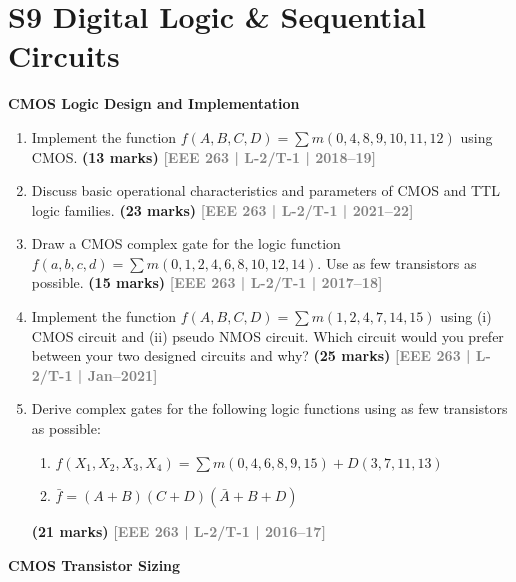 \documentclass[12pt,a4paper]{article}
\newcommand{\yr}[1]{\hfill\textcolor{gray}{\small\textbf{[#1]}}}
\newcommand{\mk}[1]{\textcolor{orange!70!black}{\small\textbf{(#1 marks)}}}
\newcommand{\subtopic}[2]{%
  \vspace{10pt}
  \noindent\begin{tcolorbox}[colback=#1!8,colframe=#1,boxrule=0.6pt,arc=4pt,
    left=6pt,right=6pt,top=4pt,bottom=4pt]
    \small\bfseries\textcolor{#1}{#2}
  \end{tcolorbox}
  \vspace{2pt}
}
\begin{document}
\section*{S9 \quad Digital Logic \& Sequential Circuits}

\subtopic{cD}{CMOS Logic Design and Implementation}
\label{sub:s9-cmos}

\begin{enumerate}

\item Implement the function $f(A,B,C,D)=\sum m(0,4,8,9,10,11,12)$ using CMOS.
\mk{13} \yr{EEE 263 | L-2/T-1 | 2018--19}

\item Discuss basic operational characteristics and parameters of CMOS and TTL logic families.
\mk{23} \yr{EEE 263 | L-2/T-1 | 2021--22}

\item Draw a CMOS complex gate for the logic function $f(a,b,c,d)=\sum m(0,1,2,4,6,8,10,12,14)$. Use as few transistors as possible.
\mk{15} \yr{EEE 263 | L-2/T-1 | 2017--18}

\item Implement the function $f(A,B,C,D)=\sum m(1,2,4,7,14,15)$ using (i) CMOS circuit and (ii) pseudo NMOS circuit. Which circuit would you prefer between your two designed circuits and why?
\mk{25} \yr{EEE 263 | L-2/T-1 | Jan--2021}

\item Derive complex gates for the following logic functions using as few transistors as possible:
\begin{enumerate}
  \item $f(X_1,X_2,X_3,X_4)=\sum m(0,4,6,8,9,15)+D(3,7,11,13)$
  \item $\bar{f}=(A+B)(C+D)(\bar{A}+B+D)$
\end{enumerate}
\mk{21} \yr{EEE 263 | L-2/T-1 | 2016--17}

\end{enumerate}

\subtopic{cD}{CMOS Transistor Sizing}
\label{sub:s9-sizing}
\end{document}
